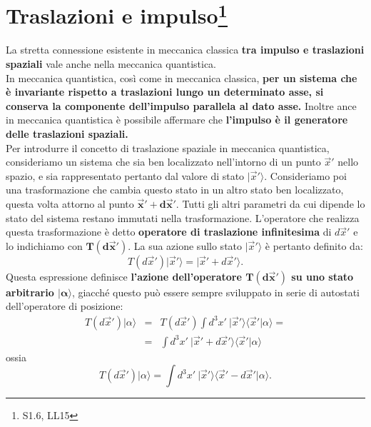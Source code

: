 \documentclass[a4paper,12pt,oneside]{book}
\begin{document}
\chapter[Traslazioni e impulso]{Traslazioni e impulso\footnote{S1.6, LL15}}
La stretta connessione esistente in meccanica classica \textbf{tra impulso e traslazioni spaziali} vale anche nella meccanica quantistica.\\
In meccanica quantistica, così come in meccanica classica, \textbf{per un sistema che è invariante rispetto a traslazioni lungo un determinato asse, si conserva la componente dell'impulso parallela al dato asse.} Inoltre ance in meccanica quantistica è possibile affermare che \textbf{l'impulso è il generatore delle traslazioni spaziali.}\\
Per introdurre il concetto di traslazione spaziale in meccanica quantistica, consideriamo un sistema che sia ben localizzato nell'intorno di un punto $\vec{x}'$ nello spazio, e sia rappresentato pertanto dal valore di stato $\vert \vec{x}' \rangle$. Consideriamo poi una trasformazione che cambia questo stato in un altro stato ben localizzato, questa volta attorno al punto $\mathbf{\vec{x}'+ d\vec{x}'}$. Tutti gli altri parametri da cui dipende lo stato del sistema restano immutati nella trasformazione. L'operatore che realizza questa trasformazione è detto \textbf{operatore di traslazione infinitesima} di $d\vec{x}'$ e lo indichiamo con $\mathbf{T(d\vec{x}')}$. La sua azione sullo stato
 $\vert \vec{x}' \rangle$ è pertanto definito da:
\begin{equation}
T(d\vec{x}')\vert \vec{x}' \rangle=\vert \vec{x}'+ d\vec{x}' \rangle .
\end{equation}
Questa espressione definisce \textbf{l'azione dell'operatore $\mathbf{T(d\vec{x}')}$ su uno stato arbitrario $\mathbf{\vert \alpha \rangle}$}, giacché questo può essere sempre sviluppato in serie di autostati dell'operatore di posizione:
\begin{eqnarray}
T(d\vec{x}') \vert \alpha \rangle & = & T(d\vec{x}') \int d^3x' \ \vert \vec{x}' \rangle \langle \vec{x}' \vert \alpha \rangle =  \nonumber \\
& = & \int d^3x' \ \vert \vec{x}' + d \vec{x}' \rangle \langle \vec{x}' \vert \alpha \rangle 
\end{eqnarray}
ossia
\begin{equation}
T(d\vec{x}') \vert \alpha \rangle  = \int d^3x' \ \vert \vec{x}'  \rangle \langle \vec{x}' - d \vec{x}' \vert \alpha \rangle .
\end{equation}
\end{document}
